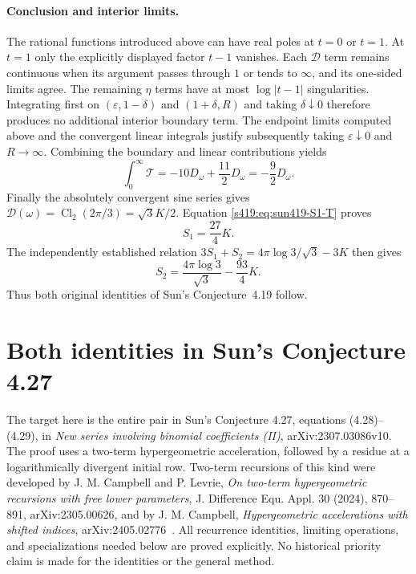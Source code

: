 \documentclass[11pt,a4paper]{article}
\theoremstyle{remark}\newtheorem{remark}[theorem]{Remark}
\numberwithin{equation}{section}
\begin{document}
\paragraph{Conclusion and interior limits.}
The rational functions introduced above can have real poles at
$t=0$ or $t=1$. At $t=1$ only the explicitly displayed factor $t-1$
vanishes. Each $\mathcal D$ term remains continuous when its argument
passes through $1$ or tends to $\infty$, and its one-sided limits agree.
The remaining $\eta$ terms have at most $\log|t-1|$ singularities.
Integrating first on $(\varepsilon,1-\delta)$ and
$(1+\delta,R)$ and taking $\delta\downarrow0$ therefore produces no
additional interior boundary term. The endpoint limits computed above
and the convergent linear integrals justify subsequently taking
$\varepsilon\downarrow0$ and $R\to\infty$.
Combining the boundary and linear contributions yields
\[
 \int_0^\infty\mathcal T
 =-10D_\omega+\frac{11}{2}D_\omega
 =-\frac92D_\omega.
\]
Finally the absolutely convergent sine series gives
$\mathcal D(\omega)=\operatorname{Cl}_2(2\pi/3)=\sqrt3 K/2$.
Equation \eqref{s419:eq:sun419-S1-T} proves
\[
 \boxed{S_1=\frac{27}{4}K.}
\]
The independently established relation
$3S_1+S_2=4\pi\log3/\sqrt3-3K$ then gives
\[
 \boxed{S_2=\frac{4\pi\log3}{\sqrt3}-\frac{93}{4}K.}
\]
Thus both original identities of Sun's Conjecture~4.19 follow.

\clearpage
\section{Both identities in Sun's Conjecture 4.27}
\label{sec:sun427}

The target here is the entire pair in Sun's Conjecture 4.27,
equations (4.28)--(4.29), in \emph{New series involving binomial
coefficients (II)}, arXiv:2307.03086v10. The proof uses a two-term
hypergeometric acceleration, followed by a residue at a logarithmically
divergent initial row. Two-term recursions of this kind were developed
by J. M. Campbell and P. Levrie, \emph{On two-term hypergeometric
recursions with free lower parameters}, J. Difference Equ. Appl.
30 (2024), 870--891, arXiv:2305.00626, and by J. M. Campbell,
\emph{Hypergeometric accelerations with shifted indices},
arXiv:2405.02776~\cite{CampbellLevrie,Campbell}. All recurrence identities, limiting operations, and
specializations needed below are proved explicitly. No historical
priority claim is made for the identities or the general method.
\end{document}
